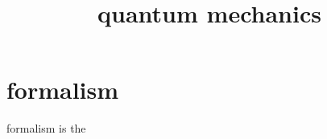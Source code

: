 \documentclass{article}
\begin{document}
\title{quantum mechanics}
\section{formalism}
formalism is the
\end{document}
